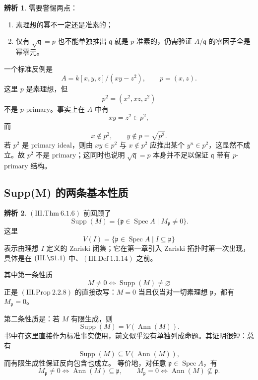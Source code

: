 \documentclass[a4paper]{ctexart}
\theoremstyle{definition}
\theoremstyle{analysis}
\newtheorem{remark}{辨析}[section]
\theoremstyle{plain}
\begin{document}
\label{rem:primary-counterexample}
\begin{remark}
需要警惕两点：
\begin{enumerate}
  \item 素理想的幂不一定还是准素的；
  \item 仅有 \(\sqrt{\mathfrak q}=p\) 也不能单独推出 \(\mathfrak q\) 就是 \(p\)-准素的，仍需验证 \(A/\mathfrak q\) 的零因子全是幂零元。
\end{enumerate}

一个标准反例是
\[
  A=k[x,y,z]/(xy-z^2),\qquad p=(x,z).
\]
这里 \(p\) 是素理想，但
\[
  p^2=(x^2,xz,z^2)
\]
不是 \(p\)-primary。事实上在 \(A\) 中有
\[
  xy=z^2\in p^2,
\]
而
\[
  x\notin p^2,\qquad y\notin p=\sqrt{p^2}.
\]
若 \(p^2\) 是 primary ideal，则由 \(xy\in p^2\) 与 \(x\notin p^2\) 应推出某个 \(y^n\in p^2\)，这显然不成立。故 \(p^2\) 不是 primary；这同时也说明 \(\sqrt{\mathfrak q}=p\) 本身并不足以保证 \(\mathfrak q\) 带有 \(p\)-primary 结构。
\end{remark}

\subsection{Supp(M) 的两条基本性质}\label{subsec:support-basic}

\begin{remark}
\label{rem:support-basic}
\((\mathrm{III.Thm}\ 6.1.6)\) 前回顾了
\[
  \operatorname{Supp}(M)=\{\mathfrak p\in \operatorname{Spec}A\mid M_{\mathfrak p}\neq 0\}.
\]
这里
\[
  V(I)=\{\mathfrak p\in \operatorname{Spec}A\mid I\subseteq \mathfrak p\}
\]
表示由理想 \(I\) 定义的 Zariski 闭集；它在第一章引入 Zariski 拓扑时第一次出现，具体是在 \((\mathrm{III.\S 1.1})\) 中、\((\mathrm{III.Def}\ 1.1.14)\) 之前。

其中第一条性质
\[
  M\neq 0 \iff \operatorname{Supp}(M)\neq \varnothing
\]
正是 \((\mathrm{III.Prop}\ 2.2.8)\) 的直接改写：\(M=0\) 当且仅当对一切素理想 \(\mathfrak p\)，都有 \(M_{\mathfrak p}=0\)。

第二条性质是：若 \(M\) 有限生成，则
\[
  \operatorname{Supp}(M)=V(\operatorname{Ann}(M)).
\]
书中在这里直接作为标准事实使用，前文似乎没有单独列成命题。其证明很短：总有
\[
  \operatorname{Supp}(M)\subseteq V(\operatorname{Ann}(M)),
\]
而有限生成性保证反向包含也成立。
等价地，对任意 \(\mathfrak p\in \operatorname{Spec}A\)，有
\[
  M_{\mathfrak p}\neq 0
  \iff
  \operatorname{Ann}(M)\subseteq \mathfrak p,
  \qquad
  M_{\mathfrak p}=0
  \iff
  \operatorname{Ann}(M)\not\subseteq \mathfrak p.
\]
\end{remark}
\end{document}
